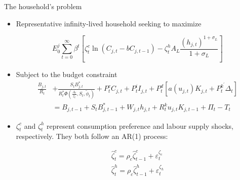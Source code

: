 \documentclass[9pt]{beamer}
\begin{document}
\begin{frame}{The household’s problem}
\begin{itemize}
    \item Representative infinity-lived household seeking to maximize
    
    $$E_{0}^{j} \sum_{t=0}^{\infty} \beta^{t}\left[\zeta_{t}^{c} \ln \left(C_{j, t}-b C_{j, t-1}\right)-\zeta_{t}^{h} A_{L} \frac{\left(h_{j, t}\right)^{1+\sigma_{L}}}{1+\sigma_{L}}\right]$$
    
    \item  Subject to the budget constraint
$$
    \begin{aligned}
    \frac{B_{j, t}}{R_{t}} &+\frac{S_{t} B_{j, t}^{*}}{R_{t}^{*} \Phi\left(\frac{A_{t}}{z_{t}}, S_{t}, \tilde{\phi}_{t}\right)}+P_{t}^{c} C_{j, t}+P_{t}^{i} I_{j, t}+P_{t}^{d}\left[a\left(u_{j, t}\right) K_{j, t}+P_{t}^{k^{\prime}} \Delta_{t}\right] \\
    &=B_{j, t-1}+S_{t} B_{j, t-1}^{*}+W_{j, t} h_{j, t}+R_{t}^{k} u_{j, t} K_{j, t-1}+\Pi_{t}-T_{t}
    \end{aligned}
$$
    
    \item $\zeta_{t}^{c}$ and $\zeta_{t}^{h}$ represent consumption preference and labour  supply shocks, respectively. They both follow an AR(1) process:
    
    $$\begin{array}{l}
\widehat{\zeta}_{t}^{c}=\rho_{c} \widehat{\zeta}_{t-1}^{c}+\varepsilon_{t}^{\zeta_c} \\
\widehat{\zeta}_{t}^{h}=\rho_{c} \widehat{\zeta}_{t-1}^{h}+\varepsilon_{t}^{\zeta_h}
\end{array}$$    

    
    
\end{itemize}

\end{frame}
\end{document}
